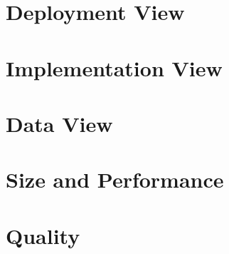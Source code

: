 \documentclass{article}
\begin{document}
\section{Deployment View}

\section{Implementation View}

\section{Data View}

\section{Size and Performance}

\section{Quality}
\end{document}
